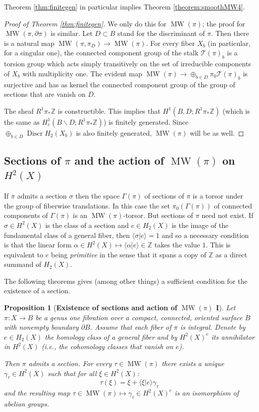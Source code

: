 \documentclass[10pt,letterpaper]{amsart}
\numberwithin{equation}{section}
\def\ZZ{{\mathbb Z}}
\def\ssm{\smallsetminus}
\def\G{\Gamma}
\def\g{\gamma}
\newcommand{\p}{\partial}
\def\Tscr{{\mathscr T}}
\def\la{\langle}
\def\ra{\rangle}
\newcommand\discr{\operatorname{Discr}}
\newcommand\MW{\operatorname{MW}}
\newtheorem{proposition}[theorem]{Proposition}
\theoremstyle{remark}
\begin{document}
Theorem \ref{thm:finitegen} in particular implies Theorem \ref{theorem:smoothMW4}.

\begin{proof}[Proof of Theorem \ref{thm:finitegen}]
We only do this for $\MW(\pi)$; the proof for $\MW(\pi, \p\pi)$ is similar. Let $D\subset B$ stand for the discriminant of $\pi$. Then there is a natural map 
$\MW(\pi, \pi_D)\to \MW(\pi)$. For every fiber $X_b$
(in particular, for a singular one),  the connected component group of the stalk $\Tscr(\pi)_b$ is a torsion group which acts simply transitively on the set of irreducible components of $X_b$ with multiplicity one. The evident map $ \MW(\pi)\to \oplus_{b\in D} \pi_0 \Tscr(\pi)_b$ is surjective and has as kernel the connected component group of the group of sections that are vanish  on $D$.

The sheaf $R^1\pi_*\ZZ$ is constructible. This implies that $H^1(B, D; R^1\pi_*\ZZ)$ (which is the same as 
$H^1_c(B\ssm D; R^1\pi_*\ZZ)$) is finitely generated. 
Since  $ \oplus_{b\in D} \discr H_2(X_b)$ is also  finitely generated, 
$\MW(\pi)$ will be as well.
\end{proof}


\subsection{Sections of $\pi$ and the action of $\MW(\pi)$ on $H^2(X)$}
If $\pi$ admits a section $\sigma$ then the space $\G(\pi)$ of sections of $\pi$ is a torsor under the group of fiberwise translations.  In this case 
the set  $\pi_0(\G(\pi))$ of connected components of $\G(\pi)$  is an $\MW(\pi)$-torsor. But sections of $\pi$ need not exist. 
 If $\sigma\in H^2(X)$ is the class of a section and $e\in H_2(X)$ is the image of the fundamental class of a general fiber,   then $\la \sigma | e\ra =1$ and so a necessary condition is that the linear form $\alpha \in H^2(X)\mapsto \la\alpha |e\ra \in \ZZ$ takes the value $1$. This is equivalent to $e$ being \emph{primitive} in the sense that it spans a copy of $\ZZ$ as a direct summand of $H_2(X)$. 

The following theorems gives (among other things) a sufficient condition for the existence of a section.  

\begin{proposition}[{\bf Existence of sections and action of $\MW(\pi)$ I}]
\label{thm:MWcohomologyI}
Let  $\pi :X\to B$ be a genus one fibration over  a compact, connected, oriented surface $B$ with nonempty boundary 
$\p B$.  Assume that each fiber of $\pi$ is integral.  Denote by $e\in H_2(X)$ the homology class of a general fiber and  by  $H^2(X)^e$ its annihilator 
in $H^2(X)$ (i.e., the cohomology classes that vanish on $e$). 

   Then $\pi$ admits a section. For every  $\tau\in \MW(\pi)$ there exists a unique $\g_\tau\in H^2(X)$ such that for all $\xi\in H^2(X)$: 
\[\tau(\xi)= \xi+\la \xi|e\ra \g_\tau\]
and the resulting map $\tau\in \MW(\pi)\mapsto  \g_\tau\in H^2(X)^e$ is an isomorphism of abelian groups.
\end{proposition}
\end{document}
